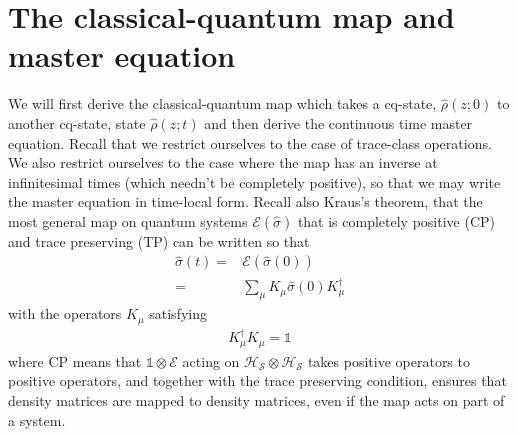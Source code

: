 \documentclass[aps,pra,showpacs,citeautoscript,amsmath,amssymb,floatfix,superscriptaddress,bbm, verbatim,amsfonts,changes,10pt,nofootinbib,longbibliography]{revtex4-1}
\newcommand{\id}{\mathbb{1}}
\def\z{{z}}
\renewcommand{\varrho}{\hat{\rho}}
\def\cqstate{\varrho}
\def\psizt{{\varrho(\z;t)}}
\def\t0{0}
\begin{document}
\section{The classical-quantum map and master equation}
\label{sec:cq-dynamics}

We will first derive the classical-quantum map which takes a cq-state, $\cqstate(\z;\t0)$ to another cq-state, state $\psizt$ and then derive the continuous time master equation. Recall that we restrict ourselves to the case of trace-class operations. We also restrict ourselves to the case where the map has an inverse at infinitesimal times (which needn't be completely positive), so that we may write the master equation in time-local form\cite{time-local}. %
Recall also Kraus's theorem, that the most general map on quantum systems $\mathcal{E}(\hat{\sigma})$ that is completely positive (CP) and trace preserving (TP) can be written so that
\begin{align}
\hat{\sigma}(t)=&\mathcal{E}(\hat{\sigma}(0))\nonumber\\
=&\sum_\mu K_\mu \hat{\sigma}(0) K^\dagger_\mu
\label{eq:kraus}
\end{align}
with the operators $K_\mu$ satisfying
\begin{align}
K_\mu^\dagger K_\mu=\id
\end{align}
where CP means that 
$\id\otimes\mathcal{E}$ acting on $\mathcal{H_S}\otimes\mathcal{H_S}$ takes positive operators to positive operators, and together with the trace preserving condition, ensures that density matrices are mapped to density matrices, even if the map acts on part of a system. 
\end{document}

